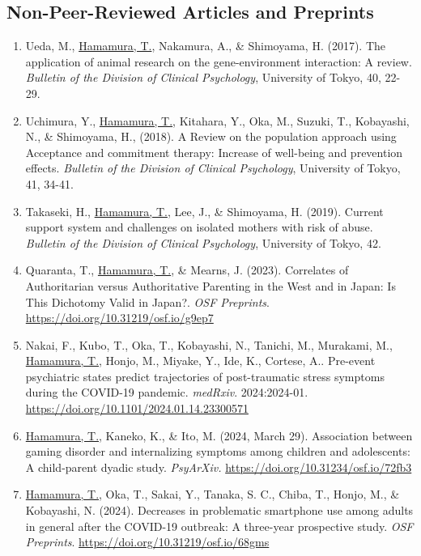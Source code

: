 \documentclass[a4paper]{article}
\begin{document}
\subsection{Non-Peer-Reviewed Articles and Preprints}
\begin{enumerate}
	\item Ueda, M., \underline{Hamamura, T.}, Nakamura, A., \& Shimoyama, H. (2017). The application of animal research on the gene-environment interaction: A review. \textit{Bulletin of the Division of Clinical Psychology}, University of Tokyo, 40, 22-29.
	\item Uchimura, Y., \underline{Hamamura, T.}, Kitahara, Y., Oka, M., Suzuki, T., Kobayashi, N., \& Shimoyama, H., (2018). A Review on the population approach using Acceptance and commitment therapy: Increase of well-being and prevention effects. \textit{Bulletin of the Division of Clinical Psychology}, University of Tokyo, 41, 34-41.
	\item Takaseki, H., \underline{Hamamura, T.}, Lee, J., \& Shimoyama, H. (2019). Current support system and challenges on isolated mothers with risk of abuse. \textit{Bulletin of the Division of Clinical Psychology}, University of Tokyo, 42.
	\item Quaranta, T., \underline{Hamamura, T.}, \& Mearns, J. (2023). Correlates of Authoritarian versus Authoritative Parenting in the West and in Japan: Is This Dichotomy Valid in Japan?. \textit{OSF Preprints}. \url{https://doi.org/10.31219/osf.io/g9ep7}
	\item Nakai, F., Kubo, T., Oka, T., Kobayashi, N., Tanichi, M., Murakami, M., \underline{Hamamura, T.}, Honjo, M., Miyake, Y., Ide, K., Cortese, A.. Pre-event psychiatric states predict trajectories of post-traumatic stress symptoms during the COVID-19 pandemic. \textit{medRxiv}. 2024:2024-01. \url{https://doi.org/10.1101/2024.01.14.23300571}
	\item \underline{Hamamura, T.}, Kaneko, K., \& Ito, M. (2024, March 29). Association between gaming disorder and internalizing symptoms among children and adolescents: A child-parent dyadic study. \textit{PsyArXiv.} \url{https://doi.org/10.31234/osf.io/72fb3}
	\item \underline{Hamamura, T.}, Oka, T., Sakai, Y., Tanaka, S. C., Chiba, T., Honjo, M., \& Kobayashi, N. (2024). Decreases in problematic smartphone use among adults in general after the COVID-19 outbreak: A three-year prospective study. \textit{OSF Preprints}. \url{https://doi.org/10.31219/osf.io/68gms}
\end{enumerate}
	 
\end{document}
